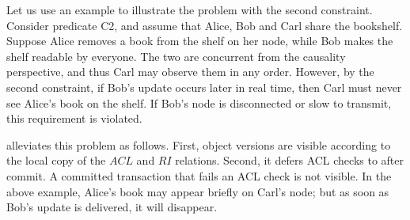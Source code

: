 Let us use an example to illustrate the problem with the second
constraint.
Consider predicate C2, and assume that Alice, Bob and Carl share the
bookshelf.
Suppose Alice removes a book from the shelf on  her node, while
Bob makes the shelf readable by everyone.
The two are concurrent from the causality perspective, and thus Carl may
observe them in any order.
However, by the second constraint, if Bob's update occurs later in real
time, then Carl must never see Alice's book on the shelf.
If Bob's node is disconnected or slow to transmit, this requirement is
violated.

\system{} alleviates this problem as follows.
First, object versions are visible according to the local copy of the
$ACL$ and $RI$ relations.
Second, it defers ACL checks to after commit.
A committed transaction that fails an ACL check is not visible.
In the above example, Alice's book may appear briefly on Carl's node;
but as soon as Bob's update is delivered, it will disappear.
